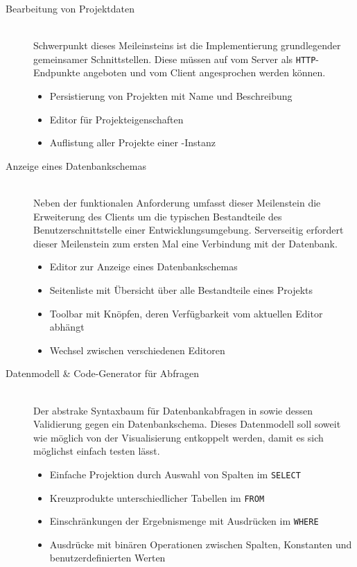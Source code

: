 \begin{description}
\item[Bearbeitung von Projektdaten] \hfill \\
  Schwerpunkt dieses Meileinsteins ist die Implementierung grundlegender gemeinsamer Schnittstellen. Diese müssen auf vom Server als \texttt{HTTP}-Endpunkte angeboten und vom Client angesprochen werden können.
  \begin{itemize}[noitemsep]
  \item Persistierung von Projekten mit Name und Beschreibung
  \item Editor für Projekteigenschaften
  \item Auflistung aller Projekte einer \idename-Instanz
  \end{itemize}
\item [Anzeige eines Datenbankschemas] \hfill \\
  Neben der funktionalen Anforderung umfasst dieser Meilenstein die Erweiterung des Clients um die typischen Bestandteile des Benutzerschnittstelle einer Entwicklungsumgebung. Serverseitig erfordert dieser Meilenstein zum ersten Mal eine Verbindung mit der Datenbank.
  \begin{itemize}[noitemsep]
  \item Editor zur Anzeige eines Datenbankschemas
  \item Seitenliste mit Übersicht über alle Bestandteile eines Projekts
  \item Toolbar mit Knöpfen, deren Verfügbarkeit vom aktuellen Editor abhängt
  \item Wechsel zwischen verschiedenen Editoren
  \end{itemize}
\item [Datenmodell \& Code-Generator für Abfragen] \hfill \\
  Der abstrake Syntaxbaum für Datenbankabfragen in \idename{} sowie dessen Validierung gegen ein Datenbankschema. Dieses Datenmodell soll soweit wie möglich von der Visualisierung entkoppelt werden, damit es sich möglichst einfach testen lässt.
  \begin{itemize}[noitemsep]
  \item Einfache Projektion durch Auswahl von Spalten im \texttt{SELECT}
  \item Kreuzprodukte unterschiedlicher Tabellen im \texttt{FROM}
  \item Einschränkungen der Ergebnismenge mit Ausdrücken im \texttt{WHERE}
  \item Ausdrücke mit binären Operationen zwischen Spalten, Konstanten und benutzerdefinierten Werten

\end{itemize}
\end{description}
